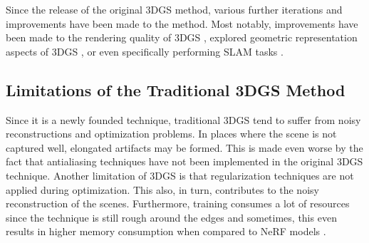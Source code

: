 Since the release of the original 3DGS method, various further iterations and improvements have been made to the method. Most notably, improvements have been made to the rendering quality of 3DGS \parencite{mipsplat} \parencite{gaussian} \parencite{gaussianpro}, explored geometric representation aspects of 3DGS \parencite{2DGS} \parencite{radegs} \parencite{gs2mesh}, or even specifically performing SLAM tasks \parencite{gs-slam} \parencite{splatam} \parencite{cg-slam}.

\subsection{Limitations of the Traditional 3DGS Method}

Since it is a newly founded technique, traditional 3DGS tend to suffer from noisy reconstructions and optimization problems. In places where the scene is not captured well, elongated artifacts may be formed. This is made even worse by the fact that antialiasing techniques have not been implemented in the original 3DGS technique. Another limitation of 3DGS is that regularization techniques are not applied during optimization. This also, in turn, contributes to the noisy reconstruction of the scenes. Furthermore, training consumes a lot of resources since the technique is still rough around the edges and sometimes, this even results in higher memory consumption when compared to NeRF models \parencite{3DGS}.
